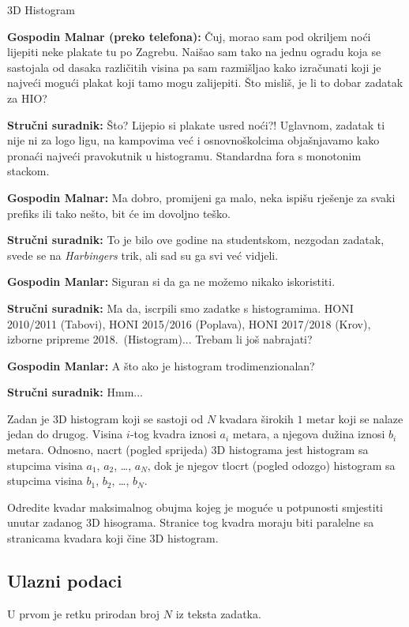 \begin{statement}[
  problempoints=100,
  timelimit=1 sekunda,
  memorylimit=512 MiB,
]{3D Histogram}

\textbf{Gospodin Malnar (preko telefona):} Čuj, morao sam pod okriljem noći
lijepiti neke plakate tu po Zagrebu. Naišao sam tako na jednu ogradu koja se
sastojala od dasaka različitih visina pa sam razmišljao kako izračunati koji
je najveći mogući plakat koji tamo mogu zalijepiti. Što misliš, je li to
dobar zadatak za HIO?

\textbf{Stručni suradnik:} Što? Lijepio si plakate usred noći?! Uglavnom,
zadatak ti nije ni za logo ligu, na kampovima već i osnovnoškolcima objašnjavamo
kako pronaći najveći pravokutnik u histogramu. Standardna fora s monotonim
stackom.

\textbf{Gospodin Malnar:} Ma dobro, promijeni ga malo, neka ispišu rješenje za
svaki prefiks ili tako nešto, bit će im dovoljno teško.

\textbf{Stručni suradnik:} To je bilo ove godine na studentskom, nezgodan
zadatak, svede se na \textit{Harbingers} trik, ali sad su ga svi već
vidjeli.

\textbf{Gospodin Manlar:} Siguran si da ga ne možemo nikako iskoristiti.

\textbf{Stručni suradnik:} Ma da, iscrpili smo zadatke s histogramima. HONI
  2010/2011 (Tabovi), HONI 2015/2016 (Poplava), HONI 2017/2018 (Krov), izborne
  pripreme 2018.\ (Histogram)... Trebam li još nabrajati?

\textbf{Gospodin Manlar:} A što ako je histogram trodimenzionalan?

\textbf{Stručni suradnik:} Hmm...

Zadan je 3D histogram koji se sastoji od $N$ kvadara širokih $1$ metar koji se
nalaze jedan do drugog. Visina $i$-tog kvadra iznosi $a_i$ metara, a njegova
dužina iznosi $b_i$ metara. Odnosno, nacrt (pogled sprijeda) 3D histograma
jest histogram sa stupcima visina $a_1$, $a_2$, \dots, $a_N$, dok je njegov
tlocrt (pogled odozgo) histogram sa stupcima visina $b_1$, $b_2$, \dots,
$b_N$.


Odredite kvadar maksimalnog obujma kojeg je moguće u potpunosti smjestiti unutar
zadanog 3D hisograma. Stranice tog kvadra moraju biti paralelne sa stranicama
kvadara koji čine 3D histogram.

\subsection*{Ulazni podaci}
U prvom je retku prirodan broj $N$ iz teksta zadatka.


\end{statement}
